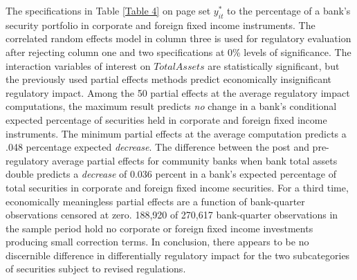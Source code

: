 \documentclass[preprint,12pt]{elsarticle}
\begin{document}
The specifications in Table \ref{Table 4} on page \pageref{Table 4} set $y_{it}^{*}$ to the percentage of a bank's security portfolio in corporate and foreign fixed income instruments.  The correlated random effects model in column three is used for regulatory evaluation after rejecting column one and two specifications at 0\% levels of significance.  The interaction variables of interest on $TotalAssets$ are statistically significant, but the previously used partial effects methods predict economically insignificant regulatory impact.  Among the 50 partial effects at the average regulatory impact computations, the maximum result predicts \textit{no} change in a bank's conditional expected percentage of securities held in corporate and foreign fixed income instruments.  The minimum partial effects at the average computation predicts a .048 percentage expected \textit{decrease}.  The difference between the post and pre-regulatory average partial effects for community banks when bank total assets double predicts a \textit{decrease} of 0.036 percent in a bank's expected percentage of total securities in corporate and foreign fixed income securities.  For a third time, economically meaningless partial effects are a function of bank-quarter observations censored at zero.  188,920 of 270,617 bank-quarter observations in the sample period hold no corporate or foreign fixed income investments producing small correction terms.  In conclusion, there appears to be no discernible difference in differentially regulatory impact for the two subcategories of securities subject to revised regulations. 
\end{document}
